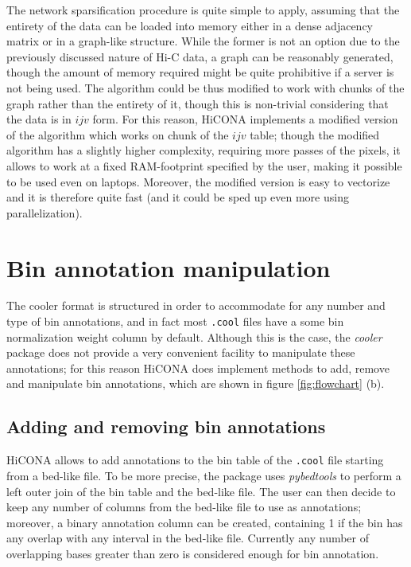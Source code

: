 The network sparsification procedure is quite simple to apply, assuming that the entirety of the data can be loaded into memory either in a dense adjacency matrix or in a graph-like structure. While the former is not an option due to the previously discussed nature of Hi-C data, a graph can be reasonably generated, though the amount of memory required might be quite prohibitive if a server is not being used. The algorithm could be thus modified to work with chunks of the graph rather than the entirety of it, though this is non-trivial considering that the data is in $ijv$ form. For this reason, HiCONA implements a modified version of the algorithm which works on chunk of the $ijv$ table; though the modified algorithm has a slightly higher complexity, requiring more passes of the pixels, it allows to work at a fixed RAM-footprint specified by the user, making it possible to be used even on laptops. Moreover, the modified version is easy to vectorize and it is therefore quite fast (and it could be sped up even more using parallelization).

\section{Bin annotation manipulation}

The cooler format is structured in order to accommodate for any number and type of bin annotations, and in fact most \texttt{.cool} files have a some bin normalization weight column by default. Although this is the case, the \emph{cooler} package does not provide a very convenient facility to manipulate these annotations; for this reason HiCONA does implement methods to add, remove and manipulate bin annotations, which are shown in figure \ref{fig:flowchart} (b). 

\subsection{Adding and removing bin annotations}

HiCONA allows to add annotations to the bin table of the \texttt{.cool} file starting from a bed-like file. To be more precise, the package uses \emph{pybedtools} to perform a left outer join of the bin table and the bed-like file. The user can then decide to keep any number of columns from the bed-like file to use as annotations; moreover, a binary annotation column can be created, containing 1 if the bin has any overlap with any interval in the bed-like file. Currently any number of overlapping bases greater than zero is considered enough for bin annotation.

